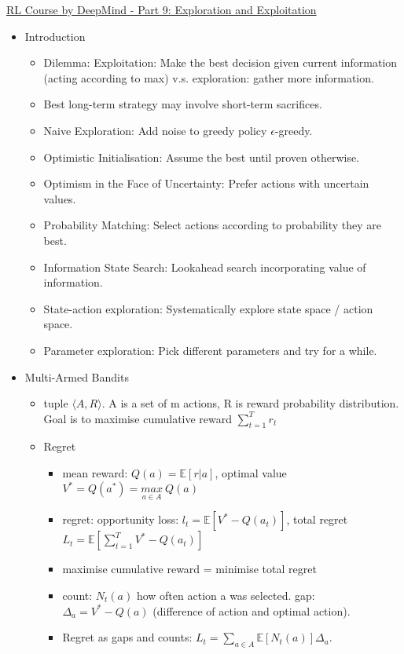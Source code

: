 \href{https://www.youtube.com/watch?v=sGuiWX07sKw}{RL Course by DeepMind - Part 9: Exploration and Exploitation}
\begin{itemize}[noitemsep,nolistsep]
	\item Introduction
	\begin{itemize}[noitemsep,nolistsep]
		\item Dilemma: Exploitation: Make the best decision given current information (acting according to max) v.s. exploration: gather more information.
		\item Best long-term strategy may involve short-term sacrifices.
		\item Naive Exploration: Add noise to greedy policy $\epsilon$-greedy.
		\item Optimistic Initialisation: Assume the best until proven otherwise.
		\item Optimism in the Face of Uncertainty: Prefer actions with uncertain values.
		\item Probability Matching: Select actions according to probability they are best.
		\item Information State Search: Lookahead search incorporating value of information.
		\item State-action exploration: Systematically explore state space / action space.
		\item Parameter exploration: Pick different parameters and try for a while. 
	\end{itemize}
	\item Multi-Armed Bandits
	\begin{itemize}[noitemsep,nolistsep]
		\item tuple $\langle A,R\rangle$. A is a set of m actions, R is reward probability distribution. Goal is to maximise cumulative reward $\sum_{t=1}^T r_t$
		\item Regret
		\begin{itemize}[noitemsep,nolistsep]
			\item mean reward: $Q(a) = \mathbb{E}[r|a]$, optimal value $V^* = Q(a^*) = \underset{a \in A}{max}\ Q(a)$
			\item regret: opportunity loss: $l_t = \mathbb{E}[V^* - Q(a_t)]$, total regret $L_t = \mathbb{E}[ \sum_{t=1}^T V^* - Q(a_t)]$
			\item maximise cumulative reward = minimise total regret
			\item count: $N_t(a)$ how often action a was selected. gap: $\Delta_a = V^* - Q(a)$ (difference of action and optimal action).
			\item Regret as gaps and counts: $L_t = \sum_{a \in A} \mathbb{E}[N_t(a)] \Delta_a$.

\end{itemize}
\end{itemize}
\end{itemize}
